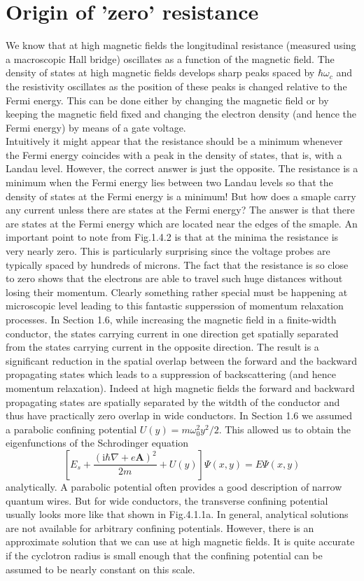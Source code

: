 \documentclass[11pt,a4paper]{book}
\theoremstyle{plain}
\theoremstyle{definition}
\theoremstyle{remark}
\newcommand{\ii}{\mathrm{i}}                      %
\renewcommand{\vec}[1]{\boldsymbol{#1}}
\begin{document}
\section{Origin of 'zero' resistance}
We know that at high magnetic fields the longitudinal resistance (measured using a macroscopic Hall bridge) oscillates as a function of the magnetic field. The density of states at high magnetic fields develops sharp peaks spaced by $\hbar \omega_c$ and the resistivity oscillates as the position of these peaks is changed relative to the Fermi energy. This can be done either by changing the magnetic field or by keeping the magnetic field fixed and changing the electron density (and hence the Fermi energy) by means of a gate voltage.\\
Intuitively it might appear that the resistance should be a minimum whenever the Fermi energy coincides with a peak in the density of states, that is, with a Landau level. However, the correct answer is just the opposite. The resistance is a minimum when the Fermi energy lies between two Landau levels so that the density of states at the Fermi energy is a minimum! But how does a smaple carry any current unless there are states at the Fermi energy? The answer is that there are states at the Fermi energy which are located near the edges of the smaple. 
An important point to note from Fig.1.4.2 is that at the minima the resistance is very nearly zero. This is particularly surprising since the voltage probes are typically spaced by hundreds of microns. The fact that the resistance is so close to zero shows that the electrons are able to travel such huge distances without losing their momentum. Clearly something rather special must be happening at microscopic level leading to this fantastic supperssion of momentum relaxation processes.
In Section 1.6, while increasing the magnetic field in a finite-width conductor, the states carrying current in one direction get spatially separated from the states carrying current in the opposite direction. The result is a significant reduction in the spatial overlap between the forward and the backward propagating states which leads to a suppression of backscattering (and hence momentum relaxation). Indeed at high magnetic fields the forward and backward propagating states are spatially separated by the witdth of the conductor and thus have practically zero overlap in wide conductors.
In Section 1.6 we assumed a parabolic confining potential $U(y) = m\omega_0^2 y^2/2$. This allowed us to obtain the eigenfunctions of the Schrodinger equation
\begin{equation}
    \left[E_s + \frac{(\ii \hbar \nabla + e \vec{A})^2}{2m} + U(y)\right]\Psi(x,y) = E\Psi(x,y)
\end{equation}
analytically. A parabolic potential often provides a good description of narrow quantum wires. But for wide conductors, the transverse confining potential usually looks more like that shown in Fig.4.1.1a. In general, analytical solutions are not available for arbitrary confining potentials. However, there is an approximate solution that we can use at high magnetic fields. It is quite accurate if the cyclotron radius is small enough that the confining potential can be assumed to be nearly constant on this scale.
\end{document}
